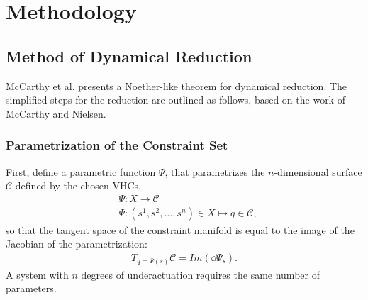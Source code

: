 \documentclass[main.tex]{subfiles}
\begin{document}
\chapter{Methodology}
\section{Method of Dynamical Reduction}
McCarthy et al. presents a Noether-like theorem for dynamical reduction\cite{mccarthy}. The simplified steps for the reduction are outlined as follows, based on the work of McCarthy and Nielsen\cite{nielsen-note}.
\subsection{Parametrization of the Constraint Set}
First, define a parametric function $\Psi$, that parametrizes the $n$-dimensional surface $\mathcal{C}$ defined by the chosen VHCs. 
\begin{align}
&\Psi:X\to\mathcal{C}\\
    &\Psi:(s^1,s^2,\ldots,s^n)\in X \mapsto q\in\mathcal{C},
\end{align}
so that the tangent space of the constraint manifold is equal to the image of the Jacobian of the parametrization:
\begin{align}
T_{q=\Psi(s)}\mathcal{C}=Im(\dd\Psi_s).
\end{align}
A system with $n$ degrees of underactuation requires the same number of parameters.
\end{document}
